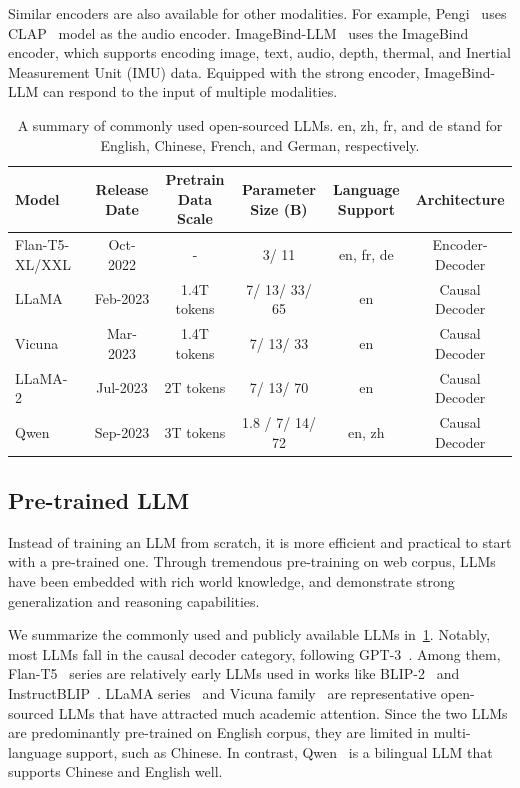 Similar encoders are also available for other modalities. For example, Pengi~\cite{deshmukh2024pengi} uses CLAP~\cite{elizalde2023clap} model as the audio encoder. ImageBind-LLM~\cite{han2023imagebind} uses the ImageBind~\cite{girdhar2023imagebind} encoder, which supports encoding image, text, audio, depth, thermal, and Inertial Measurement Unit (IMU) data. Equipped with the strong encoder, ImageBind-LLM can respond to the input of multiple modalities. 



\begin{table}[!t]
\centering
\caption{A summary of commonly used open-sourced LLMs. en, zh, fr, and de stand for English, Chinese, French, and German, respectively.}
\label{tab:llm}
\begin{tabular}{lccccc}
\toprule
\textbf{Model} & \textbf{Release Date} & \textbf{Pretrain Data Scale} & \textbf{Parameter Size  (B)} & \textbf{Language Support} & \textbf{Architecture} \\
\midrule
Flan-T5-XL/XXL~\cite{chung2022scaling} & Oct-2022 & -           & 3/ 11           & en, fr, de & Encoder-Decoder \\
LLaMA~\cite{llama}          & Feb-2023 & 1.4T tokens & 7/ 13/ 33/ 65   & en         & Causal Decoder  \\
Vicuna~\cite{vicuna}         & Mar-2023 & 1.4T tokens & 7/ 13/ 33       & en         & Causal Decoder  \\
LLaMA-2~\cite{llama-2}        & Jul-2023 & 2T tokens   & 7/ 13/ 70       & en         & Causal Decoder  \\
Qwen~\cite{qwen-lm}           & Sep-2023 & 3T tokens   & 1.8 / 7/ 14/ 72 & en, zh     & Causal Decoder  \\
\bottomrule
\end{tabular}
\end{table}

\subsection{Pre-trained LLM}
Instead of training an LLM from scratch, it is more efficient and practical to start with a pre-trained one. Through tremendous pre-training on web corpus, LLMs have been embedded with rich world knowledge, and demonstrate strong generalization and reasoning capabilities. 

We summarize the commonly used and publicly available LLMs in~\cref{tab:llm}. Notably, most LLMs fall in the causal decoder category, following GPT-3~\cite{brown2020language}. Among them, Flan-T5~\cite{chung2022scaling} series are relatively early LLMs used in works like BLIP-2~\cite{li2023blip} and InstructBLIP~\cite{instructblip}. LLaMA series~\cite{llama,llama-2} and Vicuna family~\cite{vicuna} are representative open-sourced LLMs that have attracted much academic attention. Since the two LLMs are predominantly pre-trained on English corpus, they are limited in multi-language support, such as Chinese. In contrast, Qwen~\cite{qwen-lm} is a bilingual LLM that supports Chinese and English well. 

